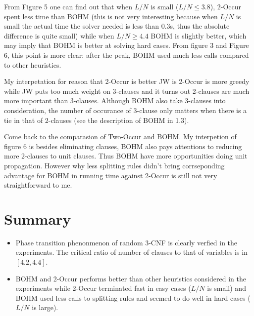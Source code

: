 \documentclass[12pt]{article}
\begin{document}
	From Figure 5 one can find out that when $L/N$ is small ($L/N\le 3.8$), 2-Occur spent less time than BOHM (this is not very interesting because when $L/N$ is small the actual time the solver needed is less than 0.3s, thus the absolute difference is quite small) while when $L/N\ge 4.4$ BOHM is slightly better, which may imply that BOHM is better at solving hard cases. From figure 3 and Figure 6, this point is more clear: after the peak, BOHM used much less calls compared to other heuristics. 
	
	My interpetation for reason that 2-Occur is better JW is  2-Occur is more greedy while JW puts too much weight on 3-clauses and it turns out 2-clauses are much more important than 3-clauses. Although BOHM also take 3-clauses into consideration, the number of occurance of 3-clause only matters when there is a tie in that of 2-clauses (see the description of BOHM in 1.3). 
	
	Come back to the comparasion of Two-Occur and BOHM. My interpetion  of  figure 6 is besides eliminating clauses, BOHM also pays attentions to reducing more 2-clauses to unit clauses. Thus BOHM have more opportunities doing unit propagation. However why less splitting rules didn't bring corrseponding advantage for BOHM in running time against 2-Occur is still not very straightforward to me.
	\section{Summary}
	\begin{itemize}
		\item Phase transition phenonmenon of random 3-CNF is clearly verfied in the experiments. The critical ratio of number of clauses to that of variables is in $[4.2,4.4]$.
		\item BOHM and 2-Occur performs better than other heuristics considered in the experiments while 2-Occur terminated fast in easy cases ($L/N$ is small) and BOHM used less calls to splitting rules and seemed to do well in hard cases ($L/N$ is large).
	\end{itemize}
\end{document}
